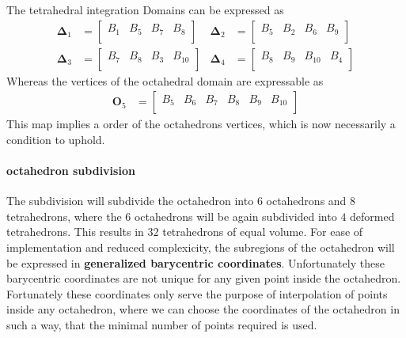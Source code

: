 \documentclass{mitschrift}
\newcommand{\simplex}{\boldsymbol{\Delta}}
\begin{document}
The tetrahedral integration Domains can be expressed as \begin{align}
    \simplex_1 &= \begin{bmatrix}
        B_1 & B_5 & B_7 & B_8 \\
    \end{bmatrix} & \simplex_2 &= \begin{bmatrix}
        B_5 & B_2 & B_6 & B_9 \\
    \end{bmatrix} \\
    \simplex_3 &= \begin{bmatrix}
        B_7 & B_8 & B_3 & B_{10} \\
    \end{bmatrix} & \simplex_4 &= \begin{bmatrix}
        B_8 & B_9 & B_{10} & B_4 \\
    \end{bmatrix}
\end{align}
Whereas the vertices of the octahedral domain are expressable as \begin{align}
    \mathbf{O}_5 &= \begin{bmatrix}
        B_{5} & B_6 & B_7 & B_{8} & B_9 & B_{10} \\
    \end{bmatrix}
\end{align}
This map implies a order of the octahedrons vertices, which is now necessarily a condition to uphold.

\paragraph{octahedron subdivision}

The subdivision will subdivide the octahedron into $6$ octahedrons and $8$ tetrahedrons, where the $6$ octahedrons will be 
again subdivided into $4$ deformed tetrahedrons. This results in $32$ tetrahedrons of equal volume.
For ease of implementation and reduced complexicity, the subregions of the octahedron will be expressed in \textbf{generalized barycentric coordinates}.
Unfortunately these barycentric coordinates are not unique for any given point inside the octahedron.
Fortunately these coordinates only serve the purpose of interpolation of points inside any octahedron, where we can choose the coordinates of the octahedron
in such a way, that the minimal number of points required is used.
\end{document}
